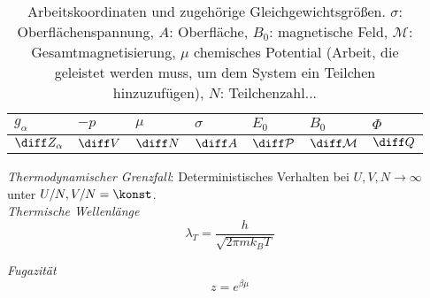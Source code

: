 \documentclass[11pt]{article}
\numberwithin{equation}{section}
\begin{document}
        \begin{table}[h]
          \begin{center}
          \begin{tabular}{ l | l l l l l l }
            $g_\alpha$ & $-p$ & $\mu$ & $\sigma$ & $E_0$ & $B_0$ & $\Phi$ \\ \hline
            $\diff Z_\alpha$ & $\diff V$ & $\diff N$ & $\diff A$ & $\diff \mathcal{P}$ & $\diff \mathcal{M}$ & $\diff Q$ \\
            \end{tabular}
          \caption{Arbeitskoordinaten und zugehörige Gleichgewichtsgrößen. $\sigma$: Oberflächenspannung, $A$: Oberfläche, $B_0$: magnetische Feld, $\mathcal{M}$: Gesamtmagnetisierung, $\mu$ chemisches Potential (Arbeit, die geleistet werden muss, um dem System ein Teilchen hinzuzufügen), $N$: Teilchenzahl...}
          \label{tab:ArbeitskoordinatenUndGleichgewichtsgroessen}
          \end{center}
        \end{table}

        \emph{Thermodynamischer Grenzfall}: Deterministisches Verhalten bei $U,V,N\rightarrow\infty$ unter $U/N,V/N=\konst$. \\


        \emph{Thermische Wellenlänge}
        \begin{equation}
          \lambda_T = \frac{h}{\sqrt{2\pi m k_B T}}
        \end{equation}

        \emph{Fugazität}
        \begin{equation}
          z = e^{\beta\mu}
        \end{equation}
\end{document}
